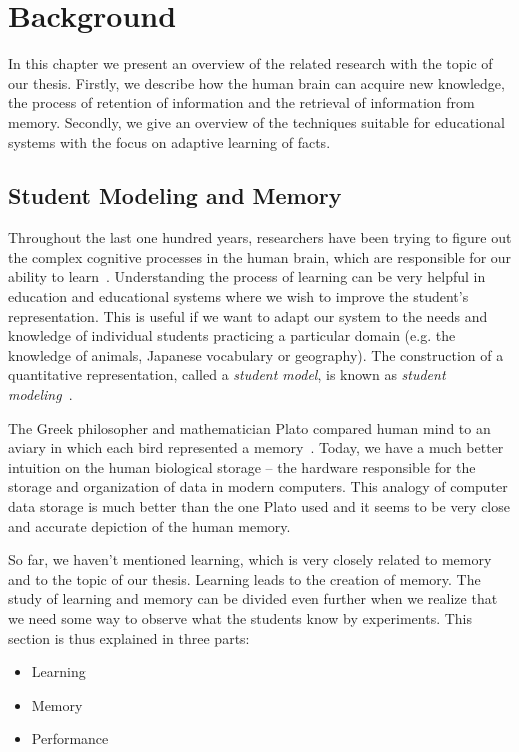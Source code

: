 \chapter{Background}

In this chapter we present an overview of the related research with the topic of our thesis. Firstly, we describe how the human brain can acquire new knowledge, the process of retention of information and the retrieval of information from memory. Secondly, we give an overview of the techniques suitable for educational systems with the focus on adaptive learning of facts.

\section{Student Modeling and Memory}

Throughout the last one hundred years, researchers have been trying to figure out the complex cognitive processes in the human brain, which are responsible for our ability to learn~\cite{RichardE.Mayer2010}. Understanding the process of learning can be very helpful in education and educational systems where we wish to improve the student's representation. This is useful if we want to adapt our system to the needs and knowledge of individual students practicing a particular domain (e.g. the knowledge of animals, Japanese vocabulary or geography). The construction of a quantitative representation, called a \textit{student model}, is known as \textit{student modeling}~\cite{Sison1998}.

The Greek philosopher and mathematician Plato compared human mind to an aviary in which each bird represented a memory~\cite{MichaelW.Eysenck2008}. Today, we have a much better intuition on the human biological storage -- the hardware responsible for the storage and organization of data in modern computers. This analogy of computer data storage is much better than the one Plato used and it seems to be very close and accurate depiction of the human memory.

So far, we haven't mentioned learning, which is very closely related to memory and to the topic of our thesis. Learning leads to the creation of memory. The study of learning and memory can be divided even further when we realize that we need some way to observe what the students know by experiments. This section is thus explained in three parts:

\begin{itemize}
  \item Learning
  \item Memory
  \item Performance
\end{itemize}

